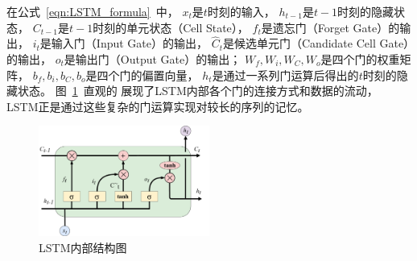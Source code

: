 在公式~\ref{eqn:LSTM_formula}~中，
$x_t$是$t$时刻的输入，
$h_{t-1}$是$t-1$时刻的隐藏状态，
$C_{t-1}$是$t-1$时刻的单元状态（Cell State），
$f_t$是遗忘门（Forget Gate）的输出，
$i_t$是输入门（Input Gate）的输出，
$\hat{C}_t$是候选单元门（Candidate Cell Gate）的输出，
$o_t$是输出门（Output Gate）的输出；
$W_f, W_i, W_C, W_o$是四个门的权重矩阵，
$b_f, b_i, b_C, b_o$是四个门的偏置向量，
$h_t$是通过一系列门运算后得出的$t$时刻的隐藏状态。
图~\ref{fig:LSTM_structure}~直观的
展现了LSTM内部各个门的连接方式和数据的流动，
LSTM正是通过这些复杂的门运算实现对较长的序列的记忆。
\begin{figure}[H]
    \includegraphics[width=0.5\textwidth]{figure/drawio/LSTM_v9.pdf}
    \centering
    \caption{LSTM内部结构图}
    \label{fig:LSTM_structure}
\end{figure}

